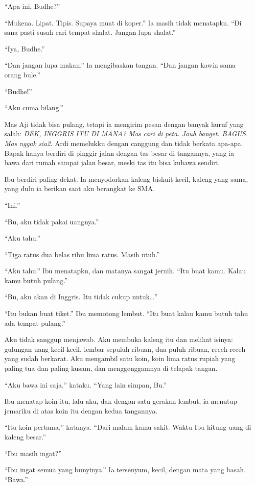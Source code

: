 \documentclass[11pt,twoside,openany]{book}
\begin{document}
``Apa ini, Budhe?''

``Mukena. Lipat. Tipis. Supaya muat di koper.'' Ia masih tidak menatapku. ``Di sana pasti susah cari tempat shalat. Jangan lupa shalat.''

``Iya, Budhe.''

``Dan jangan lupa makan.'' Ia mengibaskan tangan. ``Dan jangan kawin sama orang bule.''

``Budhe!''

``Aku cuma bilang.''

Mas Aji tidak bisa pulang, tetapi ia mengirim pesan dengan banyak huruf yang salah: \emph{DEK, INGGRIS ITU DI MANA? Mas cari di peta. Jauh banget. BAGUS. Mas nggak sia2.} Ardi memelukku dengan canggung dan tidak berkata apa-apa. Bapak hanya berdiri di pinggir jalan dengan tas besar di tangannya, yang ia bawa dari rumah sampai jalan besar, meski tas itu bisa kubawa sendiri.

Ibu berdiri paling dekat. Ia menyodorkan kaleng biskuit kecil, kaleng yang sama, yang dulu ia berikan saat aku berangkat ke SMA.

``Ini.''

``Bu, aku tidak pakai uangnya.''

``Aku tahu.''

``Tiga ratus dua belas ribu lima ratus. Masih utuh.''

``Aku tahu.'' Ibu menatapku, dan matanya sangat jernih. ``Itu buat kamu. Kalau kamu butuh pulang.''

``Bu, aku akan di Inggris. Itu tidak cukup untuk\ldots{}''

``Itu bukan buat tiket.'' Ibu memotong lembut. ``Itu buat kalau kamu butuh tahu ada tempat pulang.''

Aku tidak sanggup menjawab. Aku membuka kaleng itu dan melihat isinya: gulungan uang kecil-kecil, lembar sepuluh ribuan, dua puluh ribuan, receh-receh yang sudah berkarat. Aku mengambil satu koin, koin lima ratus rupiah yang paling tua dan paling kusam, dan menggenggamnya di telapak tangan.

``Aku bawa ini saja,'' kataku. ``Yang lain simpan, Bu.''

Ibu menatap koin itu, lalu aku, dan dengan satu gerakan lembut, ia menutup jemariku di atas koin itu dengan kedua tangannya.

``Itu koin pertama,'' katanya. ``Dari malam kamu sakit. Waktu Ibu hitung uang di kaleng besar.''

``Ibu masih ingat?''

``Ibu ingat semua yang bunyinya.'' Ia tersenyum, kecil, dengan mata yang basah. ``Bawa.''
\end{document}
